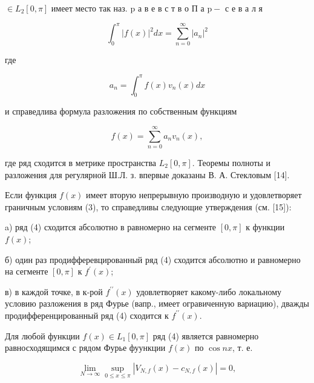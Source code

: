 \documentclass[10pt]{article}
\begin{document}
$\in L_{2}[0, \pi]$ имеет место так наз. $\mathrm{p}$ а в е в с т в о $П$ а $\mathrm{p}-$ с е в а л я



\[

\int_{0}^{\pi}|f(x)|^{2} d x=\sum_{n=0}^{\infty}\left|a_{n}\right|^{2}

\]



где



\[

a_{n}=\int_{0}^{\pi} f(x) v_{n}(x) d x

\]



и справедлива формула разложения по собственным функциям



\[

f(x)=\sum_{n=0}^{\infty} a_{n} v_{n}(x),

\]



где ряд сходится в метрике пространства $L_{2}[0, \pi]$. Теоремы полноты и разложения для регулярной Ш.Л. з. впервые доказаны В. А. Стекловым [14].



Если функция $f(x)$ имеет вторую непрерывную производную и удовлетворяет граничным условиям (3), то справедливы следующие утверждения (см. [15]):



a) ряд (4) сходится абсолютно в равномерно на сегменте $[0, \pi]$ к функции $f(x)$;



б) один раз продифферевцированный ряд (4) сходится абсолютно и равномерно на сегменте $[0, \pi]$ к $f^{\prime}(x)$;



в) в каждой точке, в к-рой $f^{\prime \prime}(x)$ удовлетворяет какому-либо локальному условию разложения в ряд Фурье (вапр., имеет огравиченную вариацию), дважды продифференцированный ряд (4) сходится к $f^{\prime \prime}(x)$.



Для любой функции $f(x) \in L_{1}[0, \pi]$ ряд (4) является равномерно равносходящимся с рядом Фурье фуункции $f(x)$ по $\cos n x$, т. е.



\[

\lim _{N \rightarrow \infty} \sup _{0 \leqslant x \leqslant \pi}\left|V_{N, f}(x)-c_{N, f}(x)\right|=0,

\]
\end{document}
